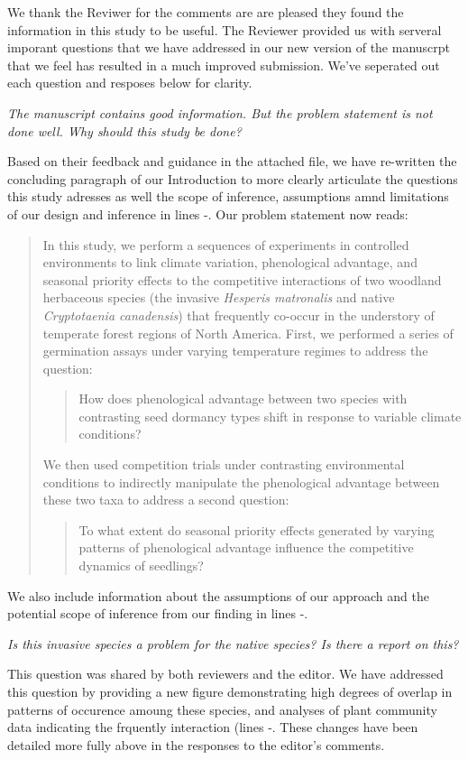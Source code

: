 \documentclass[11pt]{article}
\begin{document}
We thank the Reviwer for the comments are are pleased they found the information in this study to be useful. The Reviewer provided us with serveral imporant questions that we have addressed in our new version of the manuscrpt that we feel has resulted in a much improved submission. We've seperated out each question and resposes below for clarity.

\emph{The manuscript contains good information. But the problem statement is not done well. Why should this study be done?} 

Based on their feedback and guidance in the attached file, we have re-written the concluding paragraph of our Introduction to more clearly articulate the questions this study adresses as well the scope of inference, assumptions amnd limitations of our design and inference in lines -. Our problem statement now reads:
\begin{quote}
In this study, we perform a sequences of experiments in controlled environments to link climate variation, phenological advantage, and seasonal priority effects to the competitive interactions of two woodland herbaceous species (the invasive \textit{Hesperis matronalis} and native \textit{Cryptotaenia canadensis}) that frequently co-occur in the understory of temperate forest regions of North America. First, we performed a series of germination assays under varying temperature regimes to address the question: 
\begin{quote}How does phenological advantage between two species with contrasting seed dormancy types shift in response to variable climate conditions?\end{quote}
We then used competition trials under contrasting environmental conditions to indirectly manipulate the phenological advantage between these two taxa to address a second question: \begin{quote}To what extent do seasonal priority effects generated by varying patterns of phenological advantage influence the competitive dynamics of seedlings?\end{quote}
\end{quote}

We also include information about the assumptions of our approach and the potential scope of inference from our finding in lines -. 

\emph{Is this invasive species a problem for the native species? Is there a report on this?}

This question was shared by both reviewers and the editor. We have addressed this question by providing a new figure demonstrating high degrees of overlap in patterns of occurence amoung these species, and analyses of plant community data indicating the frquently interaction (lines -. These changes have been detailed more fully above in the responses to the editor's comments.
\end{document}
